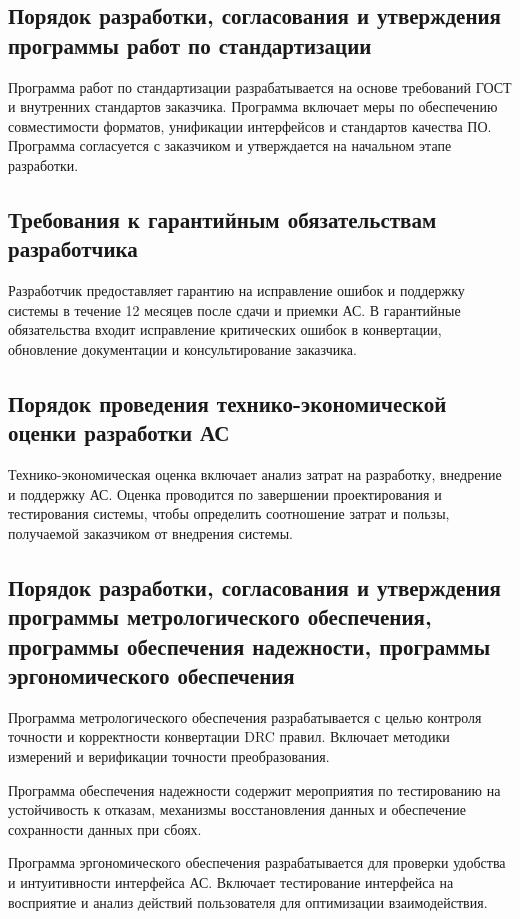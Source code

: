 \subsection{Порядок разработки, согласования
	и утверждения программы работ по стандартизации}

Программа работ по стандартизации разрабатывается на основе требований ГОСТ
и внутренних стандартов заказчика.
Программа включает меры по обеспечению совместимости форматов,
унификации интерфейсов и стандартов качества ПО.
Программа согласуется с заказчиком
и утверждается на начальном этапе разработки.

\subsection{Требования к гарантийным обязательствам разработчика}

Разработчик предоставляет гарантию на исправление ошибок
и поддержку системы в течение 12 месяцев после сдачи и приемки АС.
В гарантийные обязательства входит исправление критических ошибок
в конвертации, обновление документации и консультирование заказчика.

\subsection{Порядок проведения технико-экономической оценки разработки АС}

Технико-экономическая оценка включает анализ затрат на разработку,
внедрение и поддержку АС.
Оценка проводится по завершении проектирования и тестирования системы,
чтобы определить соотношение затрат и пользы,
получаемой заказчиком от внедрения системы.

\subsection{Порядок разработки, согласования
	и утверждения программы метрологического обеспечения,
	программы обеспечения надежности, программы эргономического обеспечения}

Программа метрологического обеспечения
разрабатывается с целью контроля точности
и корректности конвертации DRC правил.
Включает методики измерений и верификации точности преобразования.
  
Программа обеспечения надежности содержит мероприятия
по тестированию на устойчивость к отказам,
механизмы восстановления данных и обеспечение сохранности данных при сбоях.

Программа эргономического обеспечения разрабатывается
для проверки удобства и интуитивности интерфейса АС.
Включает тестирование интерфейса на восприятие
и анализ действий пользователя для оптимизации взаимодействия.

